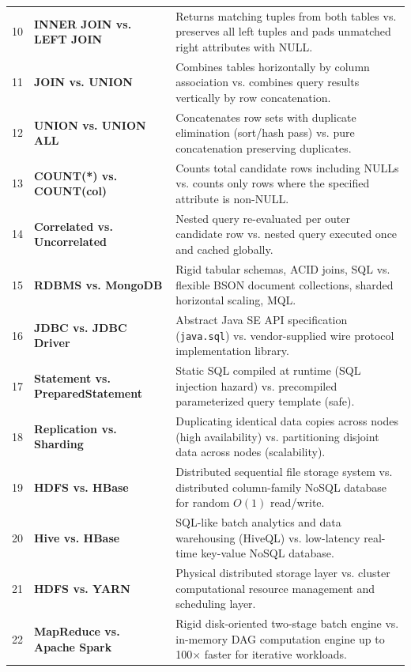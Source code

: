 \begin{table}[htbp]
\begin{tabularx}{\textwidth}{l p{3.2cm} X}
10 & \textbf{INNER JOIN vs. LEFT JOIN} & Returns matching tuples from both tables vs. preserves all left tuples and pads unmatched right attributes with NULL. \\
11 & \textbf{JOIN vs. UNION} & Combines tables horizontally by column association vs. combines query results vertically by row concatenation. \\
12 & \textbf{UNION vs. UNION ALL} & Concatenates row sets with duplicate elimination (sort/hash pass) vs. pure concatenation preserving duplicates. \\
13 & \textbf{COUNT(*) vs. COUNT(col)} & Counts total candidate rows including NULLs vs. counts only rows where the specified attribute is non-NULL. \\
14 & \textbf{Correlated vs. Uncorrelated} & Nested query re-evaluated per outer candidate row vs. nested query executed once and cached globally. \\
15 & \textbf{RDBMS vs. MongoDB} & Rigid tabular schemas, ACID joins, SQL vs. flexible BSON document collections, sharded horizontal scaling, MQL. \\
16 & \textbf{JDBC vs. JDBC Driver} & Abstract Java SE API specification (\texttt{java.sql}) vs. vendor-supplied wire protocol implementation library. \\
17 & \textbf{Statement vs. PreparedStatement} & Static SQL compiled at runtime (SQL injection hazard) vs. precompiled parameterized query template (safe). \\
18 & \textbf{Replication vs. Sharding} & Duplicating identical data copies across nodes (high availability) vs. partitioning disjoint data across nodes (scalability). \\
19 & \textbf{HDFS vs. HBase} & Distributed sequential file storage system vs. distributed column-family NoSQL database for random $O(1)$ read/write. \\
20 & \textbf{Hive vs. HBase} & SQL-like batch analytics and data warehousing (HiveQL) vs. low-latency real-time key-value NoSQL database. \\
21 & \textbf{HDFS vs. YARN} & Physical distributed storage layer vs. cluster computational resource management and scheduling layer. \\
22 & \textbf{MapReduce vs. Apache Spark} & Rigid disk-oriented two-stage batch engine vs. in-memory DAG computation engine up to 100$\times$ faster for iterative workloads. \\
\bottomrule
\end{tabularx}
\end{table}


